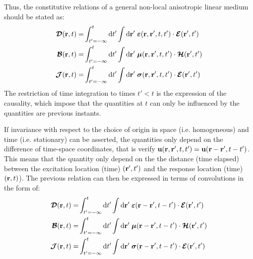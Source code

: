 Thus, the constitutive relations of a general non-local anisotropic linear medium should be stated as:
\begin{subequations}
	\begin{align}
	\boldsymbol{\mathcal{D}}(\mathbf{r}, t) 
	= &
	\int_{t'=-\infty}^t \mathop{}\!\mathrm{d} t'
	\int \mathop{}\!\mathrm{d} \mathbf{r}' \;
	\boldsymbol{\varepsilon}(\mathbf{r},\mathbf{r}', t,t') \cdot \boldsymbol{\mathcal{E}}(\mathbf{r}', t') 
	\\
	\boldsymbol{\mathcal{B}}(\mathbf{r}, t)
	=& 
	\int_{t'=-\infty}^t \mathop{}\!\mathrm{d} t'
	\int \mathop{}\!\mathrm{d} \mathbf{r}' \;
	\boldsymbol{\mu}(\mathbf{r},\mathbf{r}', t,t') \cdot \boldsymbol{\mathcal{H}}(\mathbf{r}', t')  
	\\
	\boldsymbol{\mathcal{J}}(\mathbf{r}, t)
	=& 
	\int_{t'=-\infty}^t \mathop{}\!\mathrm{d} t'
	\int \mathop{}\!\mathrm{d} \mathbf{r}' \;
	\boldsymbol{\sigma}(\mathbf{r},\mathbf{r}', t,t') \cdot \boldsymbol{\mathcal{E}}(\mathbf{r}', t')  
	\end{align}
\end{subequations}
The restriction of time integration to times $t'<t$ is the expression of the causality, which impose that the quantities at $t$ can only be influenced by the quantities are previous instants.

If invariance with respect to the choice of origin in space (i.e. homogeneous) and time (i.e. stationary) can be asserted, the quantities only depend on the difference of time-space coordinates, that is verify $\mathbf{u}(\mathbf{r},\mathbf{r}',t,t')=\mathbf{u}(\mathbf{r}-\mathbf{r}', t-t')$. This means that the quantity only depend on the the distance (time elapsed) between the excitation location (time) $(\mathbf{r}', t')$ and the response location (time) $(\mathbf{r},t)$)\parencite{Dumont2017}. The previous relation can then be expressed in terms of convolutions in the form of\parencite[p.19]{Brambilla1998}:
\begin{subequations}
	\begin{align}
	\boldsymbol{\mathcal{D}}(\mathbf{r}, t) 
	= &
	\int_{t'=-\infty}^t \mathop{}\!\mathrm{d} t'
	\int \mathop{}\!\mathrm{d} \mathbf{r}' \;
	\boldsymbol{\varepsilon}(\mathbf{r}-\mathbf{r}', t-t') \cdot \boldsymbol{\mathcal{E}}(\mathbf{r}', t') 
	\\
	\boldsymbol{\mathcal{B}}(\mathbf{r}, t)
	=& 
	\int_{t'=-\infty}^t \mathop{}\!\mathrm{d} t'
	\int \mathop{}\!\mathrm{d} \mathbf{r}' \;
	\boldsymbol{\mu}(\mathbf{r}-\mathbf{r}', t-t') \cdot \boldsymbol{\mathcal{H}}(\mathbf{r}', t')  
	\\
	\boldsymbol{\mathcal{J}}(\mathbf{r}, t)
	=& 
	\int_{t'=-\infty}^t \mathop{}\!\mathrm{d} t'
	\int \mathop{}\!\mathrm{d} \mathbf{r}' \;
	\boldsymbol{\sigma}(\mathbf{r}-\mathbf{r}', t-t') \cdot \boldsymbol{\mathcal{E}}(\mathbf{r}', t')  
	\end{align}
	\label{eq:disp_relation_dispersive_homogeneous}
\end{subequations}

